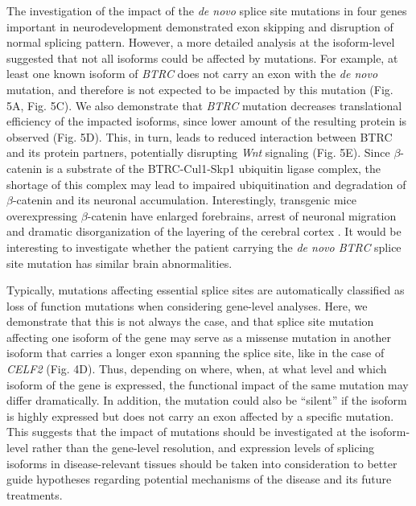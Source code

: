 \documentclass[12pt,chapterheads,final]{ucsd}
\begin{document}
The investigation of the impact of the \textit{de novo} splice site mutations in four genes important in neurodevelopment demonstrated exon skipping and disruption of normal splicing pattern. However, a more detailed analysis at the isoform-level suggested that not all isoforms could be affected by mutations. For example, at least one known isoform of \textit{BTRC} does not carry an exon with the \textit{de novo} mutation, and therefore is not expected to be impacted by this mutation (Fig. 5A, Fig. 5C). We also demonstrate that \textit{BTRC} mutation decreases translational efficiency of the impacted isoforms, since lower amount of the resulting protein is observed (Fig. 5D). This, in turn, leads to reduced interaction between BTRC and its protein partners, potentially disrupting \textit{Wnt} signaling (Fig. 5E). Since $\beta$-catenin is a substrate of the BTRC-Cul1-Skp1 ubiquitin ligase complex, the shortage of this complex may lead to impaired ubiquitination and degradation of $\beta$-catenin and its neuronal accumulation. Interestingly, transgenic mice overexpressing $\beta$-catenin have enlarged forebrains, arrest of neuronal migration and dramatic disorganization of the layering of the cerebral cortex \cite{Chenn2002}. It would be interesting to investigate whether the patient carrying the \textit{de novo BTRC} splice site mutation has similar brain abnormalities. \par

Typically, mutations affecting essential splice sites are automatically classified as loss of function mutations when considering gene-level analyses. Here, we demonstrate that this is not always the case, and that splice site mutation affecting one isoform of the gene may serve as a missense mutation in another isoform that carries a longer exon spanning the splice site, like in the case of \textit{CELF2} (Fig. 4D). Thus, depending on where, when, at what level and which isoform of the gene is expressed, the functional impact of the same mutation may differ dramatically. In addition, the mutation could also be “silent” if the isoform is highly expressed but does not carry an exon affected by a specific mutation. This suggests that the impact of mutations should be investigated at the isoform-level rather than the gene-level resolution, and expression levels of splicing isoforms in disease-relevant tissues should be taken into consideration to better guide hypotheses regarding potential mechanisms of the disease and its future treatments. \par
\end{document}
